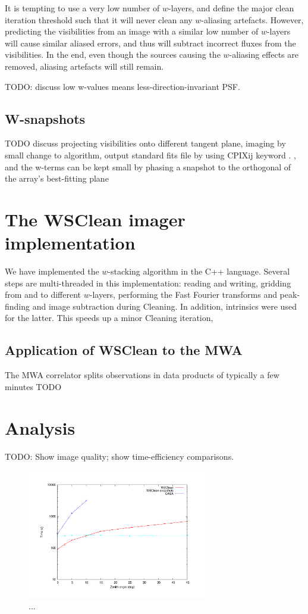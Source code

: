 \documentclass[useAMS,usenatbib]{mn2e}
\begin{document}
It is tempting to use a very low number of $w$-layers, and define the major clean iteration threshold such that it will never clean any $w$-aliasing artefacts. However, predicting the visibilities from an image with a similar low number of $w$-layers will cause similar aliased errors, and thus will subtract incorrect fluxes from the visibilities. In the end, even though the sources causing the $w$-aliasing effects are removed, aliasing artefacts will still remain.

TODO: discuss low w-values means less-direction-invariant PSF.

\subsection{W-snapshots}
TODO discuss projecting visibilities onto different tangent plane, imaging by small change to algorithm, output standard fits file by using CPIXij keyword \citet{wcs-in-fits}.
, and the w-terms can be kept small by phasing a snapshot to the orthogonal of the array's best-fitting plane

\section{The WSClean imager implementation} \label{sec:implementation}
We have implemented the $w$-stacking algorithm in the C++ language. Several steps are multi-threaded in this implementation: reading and writing, gridding from and to different $w$-layers, performing the Fast Fourier transforms and peak-finding and image subtraction during Cleaning. In addition, intrinsics were used for the latter. This speeds up a minor Cleaning iteration, 

\subsection{Application of WSClean to the MWA}
The MWA correlator splits observations in data products of typically a few minutes
TODO

\section{Analysis} \label{sec:analysis}
TODO: Show image quality; show time-efficiency comparisons.

\begin{figure}
\begin{center}
\includegraphics[width=8cm]{img/benchmark-zenith-angle/za}
\caption{...}
\label{fig:timing-zenith-angle}
\end{center}
\end{figure}
\end{document}
